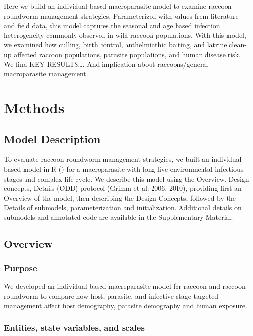 \documentclass[11pt]{article}
\begin{document}
Here we build an individual based macroparasite model to examine raccoon
roundworm management strategies. Parameterized with values from
literature and field data, this model captures the seasonal and age
based infection heterogeneity commonly observed in wild raccoon
populations. With this model, we examined how culling, birth control,
anthelminthic baiting, and latrine clean-up affected raccoon
populations, parasite populations, and human disease risk. We find KEY
RESULTS\ldots{}. And implication about raccoons/general macroparasite
management.

\section{Methods}

\subsection{Model Description}

To evaluate raccoon roundworm management strategies, we built an
individual-based model in R () for a macroparasite with long-live
environmental infectious stages and complex life cycle. We describe this
model using the Overview, Design concepts, Details (ODD) protocol (Grimm
et al. 2006, 2010), providing first an Overview of the model, then
describing the Design Concepts, followed by the Details of submodels,
parameterization and initialization. Additional details on submodels and
annotated code are available in the Supplementary Material.

\subsection{Overview}

\subsubsection{Purpose}

We developed an individual-based macroparasite model for raccoon and
raccoon roundworm to compare how host, parasite, and infective stage
targeted management affect host demography, parasite demography and
human exposure.

\subsubsection{Entities, state variables, and scales}
\end{document}
